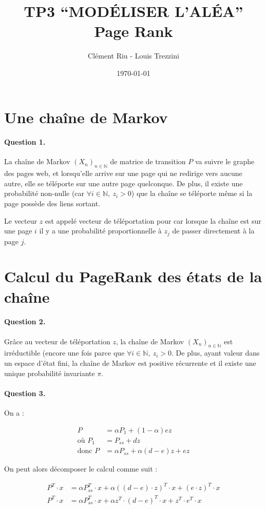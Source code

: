 \documentclass[12pt,a4paper]{article}
\title{\textbf{TP3 “MODÉLISER L’ALÉA” \\ Page Rank}}
\author{Clément Riu - Louis Trezzini}
\date{\today}
\newcommand{\N}{\mathbb{N}}
\begin{document}
\maketitle

\section{Une chaîne de Markov}

\paragraph*{Question 1.} La chaîne de Markov $(X_n)_{n \in \N}$ de matrice de transition $P$ va suivre le graphe des pages web, et lorsqu'elle arrive sur une page qui ne redirige vers aucune autre, elle se téléporte sur une autre page quelconque. De plus, il existe une probabilité non-nulle (car $\forall i \in \N, \ z_i > 0$) que la chaîne se téléporte même si la page possède des liens sortant.

Le vecteur $z$ est appelé vecteur de téléportation pour car lorsque la chaîne est sur une page $i$ il y a une probabilité proportionnelle à $z_j$ de passer directement à la page $j$.

\section{Calcul du PageRank des états de la chaîne}

\paragraph*{Question 2.} Grâce au vecteur de téléportation $z$, la chaîne de Markov $(X_n)_{n \in \N}$ est irréductible (encore une fois parce que $\forall i \in \N, \ z_i > 0$. De plus, ayant valeur dans un espace d'état fini, la chaîne de Markov est positive récurrente et il existe une unique probabilité invariante $\pi$.

\paragraph*{Question 3.} On a :

\begin{align*}
	P &= \alpha P_1 + (1 - \alpha) e z \\
	\text{o\`u } P_1 &= P_{ss} + dz \\
	\text{donc } P &= \alpha P_{ss} + \alpha (d - e) z + e z
\end{align*}

On peut alors décomposer le calcul comme suit :

\begin{align*}
	P^T \cdot x &= \alpha P_{ss}^T \cdot x + \alpha \left( \left(d - e\right) \cdot z \right)^T \cdot x + (e \cdot z)^T \cdot x \\
		P^T \cdot x &= \alpha P_{ss}^T \cdot x + \alpha z^T \cdot (d - e)^T \cdot x + z^T \cdot e^T \cdot x \\
\end{align*}
\end{document}
